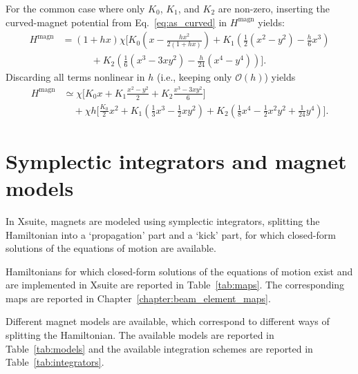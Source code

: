 For the common case where only $K_0$, $K_1$, and $K_2$ are non-zero, inserting
the curved-magnet potential from Eq.~\eqref{eq:as_curved} in $H^\text{magn}$ yields:
\begin{align}
  H^\text{magn} &= (1+h x)\chi \Bigg[
    K_0\left(x-\frac{h x^{2}}{2(1+h x)}\right)
    + K_1\left(\frac{1}{2}(x^{2}-y^{2})-\frac{h}{6}x^{3}\right) \nonumber\\
  &\qquad\quad
    + K_2\left(\frac{1}{6}(x^{3}-3xy^{2})-\frac{h}{24}(x^{4}-y^{4})\right)
  \Bigg].
\end{align}
Discarding all terms nonlinear in $h$ (i.e., keeping only $\mathcal{O}(h)$) yields
\begin{align}
  H^\text{magn} &\simeq \chi \Bigg[
    K_0 x
    + K_1 \frac{x^{2}-y^{2}}{2}
    + K_2 \frac{x^{3}-3xy^{2}}{6}
  \Bigg] \nonumber\\
  &\quad + \chi h \Bigg[
    \frac{K_0}{2} x^{2}
    + K_1 \left(\frac{1}{3}x^{3}-\frac{1}{2}x y^{2}\right)
    + K_2 \left(\frac{1}{8}x^{4}-\frac{1}{2}x^{2}y^{2}+\frac{1}{24}y^{4}\right)
  \Bigg].
\end{align}


\section{Symplectic integrators and magnet models}\label{sec:symplectic_integrators}

In Xsuite, magnets are modeled using symplectic integrators, splitting the Hamiltonian
into a `propagation' part and a `kick' part, for which closed-form solutions of the equations of motion
are available.

Hamiltonians for which closed-form solutions of the equations of motion exist and are
implemented in Xsuite are reported in Table~\ref{tab:maps}. The corresponding
maps are reported in Chapter~\ref{chapter:beam_element_maps}.

Different magnet models are available, which correspond to different ways of splitting
the Hamiltonian. The available models are reported in Table~\ref{tab:models} and
the available integration schemes are reported in Table~\ref{tab:integrators}.


